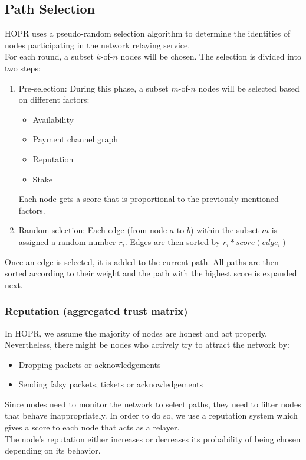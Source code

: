 \subsection{Path Selection}
HOPR uses a pseudo-random selection algorithm to determine the identities of nodes participating in the network relaying service.
\\For each round, a subset $k$-of-$n$ nodes will be chosen. The selection is divided into two steps:
\begin{enumerate}
    \item Pre-selection: 
    During this phase, a subset $m$-of-$n$ nodes will be selected based on different factors:
    \begin{itemize}
        \item Availability
        \item Payment channel graph
        \item Reputation
        \item Stake
    \end{itemize}
Each node gets a score that is proportional to the previously mentioned factors.
\item Random selection: 
Each edge (from node $a$ to $b$) within the subset $m$ is assigned a random number $r_i$. Edges are then sorted by $r_i*score(edge_i)$
\end{enumerate}
Once an edge is selected, it is added to the current path. All paths are then sorted according to their weight and the path with the highest score is expanded next.

\subsubsection{Reputation (aggregated trust matrix)}

In HOPR, we assume the majority of nodes are honest and act properly. Nevertheless, there might be nodes who actively try to attract the network by:
\begin{itemize}
    \item Dropping packets or acknowledgements
    \item Sending falsy packets, tickets or acknowledgements
\end{itemize}
Since nodes need to monitor the network to select paths, they need to filter nodes that behave inappropriately. 
In order to do so, we use a reputation system which gives a score to each node that acts as a relayer. 
\\The node’s reputation either increases or decreases its probability of being chosen depending on its behavior.

